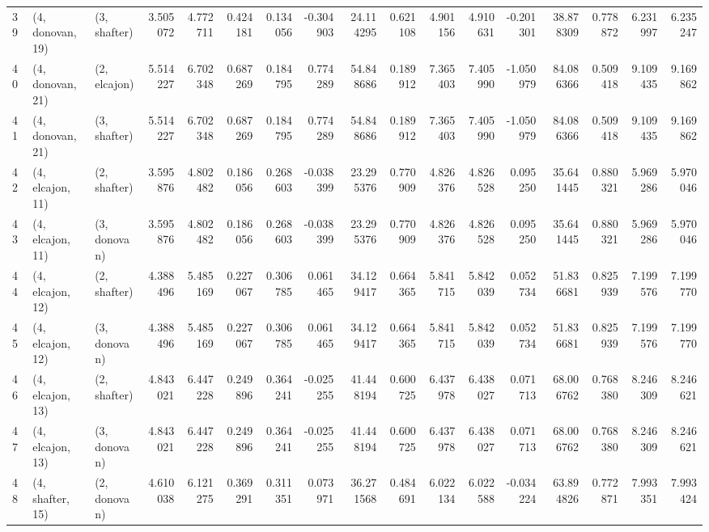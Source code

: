 \begin{tabular}{lllrrrrrrrrrrrrrr}
39 &  (4, donovan, 19) &     (3, shafter) &  3.505072 &  4.772711 &   0.424181 &  0.134056 & -0.304903 &   24.114295 &  0.621108 &   4.901156 &   4.910631 & -0.201301 &   38.878309 &  0.778872 &   6.231997 &   6.235247 \\
40 &  (4, donovan, 21) &     (2, elcajon) &  5.514227 &  6.702348 &   0.687269 &  0.184795 &  0.774289 &   54.848686 &  0.189912 &   7.365403 &   7.405990 & -1.050979 &   84.086366 &  0.509418 &   9.109435 &   9.169862 \\
41 &  (4, donovan, 21) &     (3, shafter) &  5.514227 &  6.702348 &   0.687269 &  0.184795 &  0.774289 &   54.848686 &  0.189912 &   7.365403 &   7.405990 & -1.050979 &   84.086366 &  0.509418 &   9.109435 &   9.169862 \\
42 &  (4, elcajon, 11) &     (2, shafter) &  3.595876 &  4.802482 &   0.186056 &  0.268603 & -0.038399 &   23.295376 &  0.770909 &   4.826376 &   4.826528 &  0.095250 &   35.641445 &  0.880321 &   5.969286 &   5.970046 \\
43 &  (4, elcajon, 11) &     (3, donovan) &  3.595876 &  4.802482 &   0.186056 &  0.268603 & -0.038399 &   23.295376 &  0.770909 &   4.826376 &   4.826528 &  0.095250 &   35.641445 &  0.880321 &   5.969286 &   5.970046 \\
44 &  (4, elcajon, 12) &     (2, shafter) &  4.388496 &  5.485169 &   0.227067 &  0.306785 &  0.061465 &   34.129417 &  0.664365 &   5.841715 &   5.842039 &  0.052734 &   51.836681 &  0.825939 &   7.199576 &   7.199770 \\
45 &  (4, elcajon, 12) &     (3, donovan) &  4.388496 &  5.485169 &   0.227067 &  0.306785 &  0.061465 &   34.129417 &  0.664365 &   5.841715 &   5.842039 &  0.052734 &   51.836681 &  0.825939 &   7.199576 &   7.199770 \\
46 &  (4, elcajon, 13) &     (2, shafter) &  4.843021 &  6.447228 &   0.249896 &  0.364241 & -0.025255 &   41.448194 &  0.600725 &   6.437978 &   6.438027 &  0.071713 &   68.006762 &  0.768380 &   8.246309 &   8.246621 \\
47 &  (4, elcajon, 13) &     (3, donovan) &  4.843021 &  6.447228 &   0.249896 &  0.364241 & -0.025255 &   41.448194 &  0.600725 &   6.437978 &   6.438027 &  0.071713 &   68.006762 &  0.768380 &   8.246309 &   8.246621 \\
48 &  (4, shafter, 15) &     (2, donovan) &  4.610038 &  6.121275 &   0.369291 &  0.311351 &  0.073971 &   36.271568 &  0.484691 &   6.022134 &   6.022588 & -0.034224 &   63.894826 &  0.772871 &   7.993351 &   7.993424 \\

\end{tabular}
